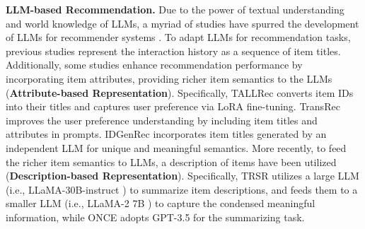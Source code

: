 \documentclass[sigconf]{acmart}
\begin{document}
\smallskip
\noindent\textbf{LLM-based Recommendation. }
Due to the power of textual understanding and world knowledge of LLMs, a myriad of studies have spurred the development of LLMs for recommender systems \cite{bao2023tallrec, wang2023zero,kim2024large,zhang2023collm, liu2024once}. 
To adapt LLMs for recommendation tasks, previous studies represent the interaction history as a sequence of item titles.
Additionally, some studies enhance recommendation performance by incorporating item attributes, providing richer item semantics to the LLMs (\textbf{Attribute-based Representation}).
Specifically, TALLRec \cite{bao2023tallrec} converts item IDs into their titles and captures user preference via LoRA \cite{hu2021lora} fine-tuning. TransRec \cite{lin2024bridging} improves the user preference understanding by including item titles and attributes in prompts. IDGenRec \cite{tan2024idgenrec} incorporates item titles generated by an independent LLM for unique and meaningful semantics.
More recently, to feed the richer item semantics to LLMs, a description of items have been utilized (\textbf{Description-based Representation}).
Specifically, TRSR \cite{zheng2024harnessing} utilizes a large LLM (i.e., LLaMA-30B-instruct \cite{touvron2023llama}) to summarize item descriptions, and feeds them to a smaller LLM (i.e., LLaMA-2 7B \cite{touvron2023llama2}) to capture the condensed meaningful information, while ONCE \cite{liu2024once} adopts GPT-3.5 \cite{brown2020language} for the summarizing task.
\end{document}
